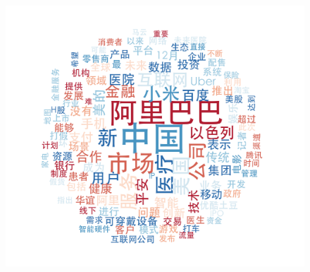 \documentclass{beamer}
\begin{document}
\begin{frame}
\begin{figure}
    \includegraphics[height=0.3\textheight]{plot/Dec-wordcloud.png}\\

\end{figure}
\end{frame}
\end{document}
